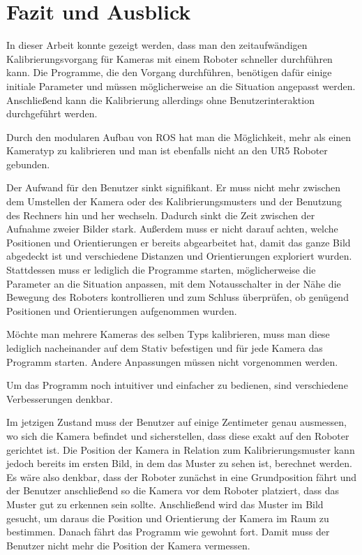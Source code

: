 \chapter{Fazit und Ausblick}
\label{chap:fazit_und_ausblick}
In dieser Arbeit konnte gezeigt werden, dass man den zeitaufwändigen Kalibrierungsvorgang für Kameras mit einem Roboter schneller durchführen kann. Die Programme, die den Vorgang durchführen, benötigen dafür einige initiale Parameter und müssen möglicherweise an die Situation angepasst werden. Anschließend kann die Kalibrierung allerdings ohne Benutzerinteraktion durchgeführt werden.

Durch den modularen Aufbau von ROS hat man die Möglichkeit, mehr als einen Kameratyp zu kalibrieren und man ist ebenfalls nicht an den UR5 Roboter gebunden. 

Der Aufwand für den Benutzer sinkt signifikant. Er muss nicht mehr zwischen dem Umstellen der Kamera oder des Kalibrierungsmusters und der Benutzung des Rechners hin und her wechseln. Dadurch sinkt die Zeit zwischen der Aufnahme zweier Bilder stark. Außerdem muss er nicht darauf achten, welche Positionen und Orientierungen er bereits abgearbeitet hat, damit das ganze Bild abgedeckt ist und verschiedene Distanzen und Orientierungen exploriert wurden. Stattdessen muss er lediglich die Programme starten, möglicherweise die Parameter an die Situation anpassen, mit dem Notausschalter in der Nähe die Bewegung des Roboters kontrollieren und zum Schluss überprüfen, ob genügend Positionen und Orientierungen aufgenommen wurden.

Möchte man mehrere Kameras des selben Typs kalibrieren, muss man diese lediglich nacheinander auf dem Stativ befestigen und für jede Kamera das Programm starten. Andere Anpassungen müssen nicht vorgenommen werden.

Um das Programm noch intuitiver und einfacher zu bedienen, sind verschiedene Verbesserungen denkbar.

Im jetzigen Zustand muss der Benutzer auf einige Zentimeter genau ausmessen, wo sich die Kamera befindet und sicherstellen, dass diese exakt auf den Roboter gerichtet ist. Die Position der Kamera in Relation zum Kalibrierungsmuster kann jedoch bereits im ersten Bild, in dem das Muster zu sehen ist, berechnet werden. Es wäre also denkbar, dass der Roboter zunächst in eine Grundposition fährt und der Benutzer anschließend so die Kamera vor dem Roboter platziert, dass das Muster gut zu erkennen sein sollte. Anschließend wird das Muster im Bild gesucht, um daraus die Position und Orientierung der Kamera im Raum zu bestimmen. Danach fährt das Programm wie gewohnt fort. Damit muss der Benutzer nicht mehr die Position der Kamera vermessen.

